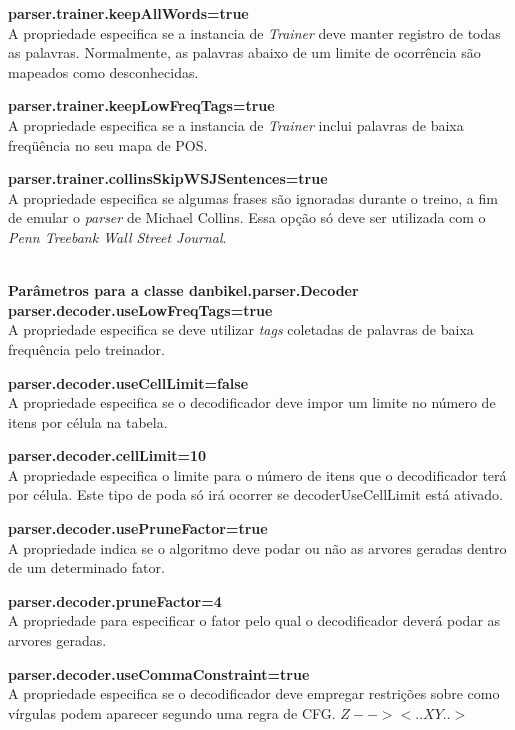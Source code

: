 \textbf{parser.trainer.keepAllWords=true}\\
A propriedade especifica se a instancia de \emph{Trainer} deve manter registro de todas as palavras. Normalmente, as palavras abaixo de um limite de ocorrência são mapeados como desconhecidas.

\textbf{parser.trainer.keepLowFreqTags=true}\\
A propriedade especifica se a instancia de \emph{Trainer} inclui palavras de baixa freqüência no seu mapa de POS.

\textbf{parser.trainer.collinsSkipWSJSentences=true}\\
A propriedade especifica se algumas frases são ignoradas durante o treino, a fim de emular o \emph{parser} de Michael Collins. Essa opção só deve ser utilizada com o \emph{Penn Treebank Wall Street Journal}.

\HRule \\

\textbf{Parâmetros para a classe danbikel.parser.Decoder}\\

\textbf{parser.decoder.useLowFreqTags=true}\\
A propriedade especifica se deve utilizar \emph{tags} coletadas de palavras de baixa frequência pelo treinador.

\textbf{parser.decoder.useCellLimit=false}\\
A propriedade especifica se o decodificador deve impor um limite no número de itens por célula na tabela.

\textbf{parser.decoder.cellLimit=10}\\
A propriedade especifica o limite para o número de itens que o decodificador terá por célula. Este tipo de poda só irá ocorrer se decoderUseCellLimit está ativado.

\textbf{parser.decoder.usePruneFactor=true}\\
A propriedade indica se o algoritmo deve podar ou não as arvores geradas dentro de um determinado fator.

\textbf{parser.decoder.pruneFactor=4}\\
A propriedade para especificar o fator pelo qual o decodificador deverá podar as arvores geradas. 

\textbf{parser.decoder.useCommaConstraint=true}\\
A propriedade  especifica se o decodificador deve empregar restrições sobre como vírgulas podem aparecer segundo uma regra de CFG.
$Z --> <.. X Y..>$

